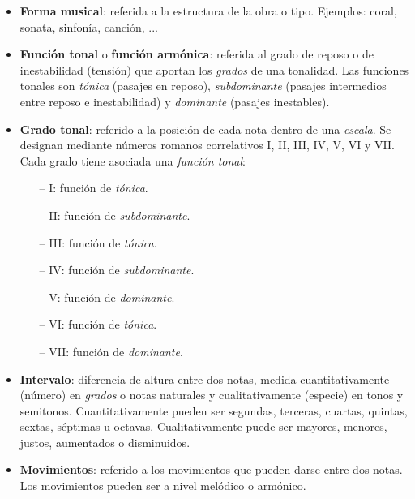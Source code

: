 \begin{itemize}[label={}, leftmargin=*]
	\bigskip

	\item \textbf{Forma musical}: referida a la estructura de la obra o tipo. Ejemplos: coral, sonata, sinfonía, canción, ...

	\bigskip

	\item \textbf{Función tonal} o \textbf{función armónica}: referida al grado de reposo o de inestabilidad (tensión) que aportan los \textit{grados} de una tonalidad. Las funciones tonales son \textit{tónica} (pasajes en reposo), \textit{subdominante} (pasajes intermedios entre reposo e inestabilidad)  y \textit{dominante} (pasajes inestables). 

	\bigskip

	\item \textbf{Grado tonal}: referido a la posición de cada nota dentro de una \textit{escala}. Se designan mediante números romanos correlativos I, II, III, IV, V, VI y VII. Cada grado tiene asociada una \textit{función tonal}:

	\begin{itemize}

		\item[--] I: función de \textit{tónica}.
		\item[--] II: función de \textit{subdominante}.
		\item[--] III: función de \textit{tónica}.
		\item[--] IV: función de \textit{subdominante}.
		\item[--] V: función de \textit{dominante}.
		\item[--] VI: función de \textit{tónica}.
		\item[--] VII: función de \textit{dominante}.

	\end{itemize}

	\bigskip

	\item \textbf{Intervalo}: diferencia de altura entre dos notas, medida cuantitativamente (número) en \textit{grados} o notas naturales y cualitativamente (especie) en tonos y semitonos. Cuantitativamente pueden ser segundas, terceras, cuartas, quintas, sextas, séptimas u octavas. Cualitativamente puede ser mayores, menores, justos, aumentados o disminuidos.

	\bigskip

	\item \textbf{Movimientos}: referido a los movimientos que pueden darse entre dos notas. Los movimientos pueden ser a nivel melódico o armónico.


\end{itemize}
